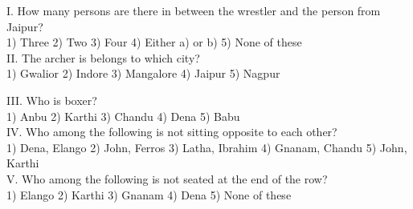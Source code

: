 \documentclass[
]{article}
\begin{document}
I. How many persons are there in between the wrestler and the person from Jaipur?\\
1) Three \hspace{2mm}2) Two \hspace{2mm}3) Four \hspace{2mm}4) Either a) or b) \hspace{2mm}5) None of these\\

II. The archer is belongs to which city?\\
1) Gwalior \hspace{2mm}2) Indore \hspace{2mm}3) Mangalore \hspace{2mm}4) Jaipur \hspace{2mm}5) Nagpur

III. Who is boxer?\\
1) Anbu \hspace{2mm}2) Karthi \hspace{2mm}3) Chandu \hspace{2mm}4) Dena \hspace{2mm}5) Babu\\

IV. Who among the following is not sitting opposite to each other?\\
1) Dena, Elango \hspace{2mm}2) John, Ferros \hspace{2mm}3) Latha, Ibrahim
\hspace{2mm}4) Gnanam, Chandu \hspace{2mm}5) John, Karthi\\

V. Who among the following is not seated at the end of the row?\\
1) Elango \hspace{2mm}2) Karthi \hspace{2mm}3) Gnanam \hspace{2mm}4) Dena \hspace{2mm}5) None of these\\
\end{document}
